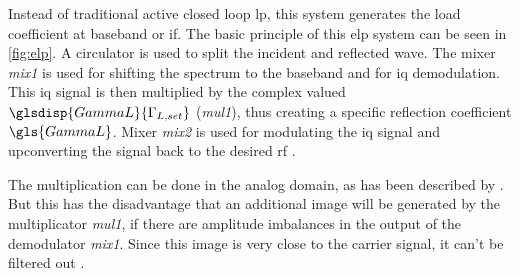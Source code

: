 \documentclass[12pt,a4paper,parskip=full,abstract=true,BCOR=12mm,twoside,open=right]{scrreprt}
\def\device#1{\textit{#1}}
\begin{document}
Instead of traditional active closed loop \gls{lp}, this system generates the
load coefficient at baseband or \gls{if}. The basic principle of this \gls{elp} system
can be seen in \cref{fig:elp}. A circulator is used to split the incident and
reflected wave. The mixer \device{mix1} is used for shifting the spectrum to
the baseband and for \gls{iq} demodulation. This \gls{iq} signal is then
multiplied by the complex valued $\glsdisp{GammaL}{\Gamma_{L,set}}$ (\device{mul1}), thus creating a specific
reflection coefficient $\gls{GammaL}$. Mixer \device{mix2} is used for modulating
the \gls{iq} signal and upconverting the signal back to the desired \gls{rf} \cite{williams_experimental_2005}.

The multiplication can be done in the analog domain, as has been described
by \cite{williams_experimental_2005}. But this has the disadvantage that
an additional image will be generated by the multiplicator \device{mul1},
if there are amplitude imbalances in the output
of the demodulator \device{mix1}. Since this image is very close to the
carrier signal, it can't be filtered out \cite{hashmi_agile_2010}.
\end{document}
